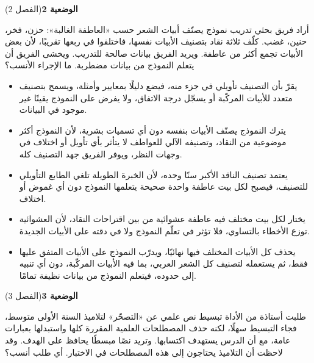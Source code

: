 \documentclass[11pt,a4paper]{article}
\begin{document}
\par\vspace{6pt}
\noindent
{\large\khatt\textbf{الوضعية 2}}\hfill{\small(الفصل 2)}\par\nopagebreak\vspace{3pt}
\setlength{\fboxsep}{7pt}\colorbox{gray!10}{\parbox{\dimexpr\linewidth-14pt}{أراد فريق بحثي تدريب نموذج يصنّف أبيات الشعر حسب «العاطفة الغالبة»: حزن، فخر، حنين، غضب. كلّف ثلاثة نقاد بتصنيف الأبيات نفسها، فاختلفوا في ربعها تقريبًا، لأن بعض الأبيات تجمع أكثر من عاطفة. ويريد الفريق بيانات صالحة للتدريب. ويخشى الفريق أن يتعلم النموذج من بيانات مضطربة. ما الإجراء الأنسب؟}}\par\nopagebreak
\begin{itemize}[leftmargin=1.0cm, labelsep=6pt, itemsep=3pt, topsep=4pt, parsep=0pt]
  \item[\textbf{أ)}] يقرّ بأن التصنيف تأويلي في جزء منه، فيضع دليلًا بمعايير وأمثلة، ويسمح بتصنيف متعدد للأبيات المركّبة أو يسجّل درجة الاتفاق، ولا يفرض على النموذج يقينًا غير موجود في البيانات.
  \item[\textbf{ب)}] يترك النموذج يصنّف الأبيات بنفسه دون أي تسميات بشرية، لأن النموذج أكثر موضوعية من النقاد، وتصنيفه الآلي للعواطف لا يتأثر بأي تأويل أو اختلاف في وجهات النظر، ويوفر الفريق جهد التصنيف كله.
  \item[\textbf{ج)}] يعتمد تصنيف الناقد الأكبر سنًا وحده، لأن الخبرة الطويلة تلغي الطابع التأويلي للتصنيف، فيصبح لكل بيت عاطفة واحدة صحيحة يتعلمها النموذج دون أي غموض أو اختلاف.
  \item[\textbf{د)}] يختار لكل بيت مختلف فيه عاطفة عشوائية من بين اقتراحات النقاد، لأن العشوائية توزع الأخطاء بالتساوي، فلا تؤثر في تعلّم النموذج ولا في دقته على الأبيات الجديدة.
  \item[\textbf{هـ)}] يحذف كل الأبيات المختلف فيها نهائيًا، ويدرّب النموذج على الأبيات المتفق عليها فقط، ثم يستعمله لتصنيف كل الشعر العربي، بما فيه الأبيات المركّبة، دون أي تنبيه إلى حدوده، فيتعلم النموذج من بيانات نظيفة تمامًا.
\end{itemize}
\par\vspace{6pt}
\noindent
{\large\khatt\textbf{الوضعية 3}}\hfill{\small(الفصل 3)}\par\nopagebreak\vspace{3pt}
\setlength{\fboxsep}{7pt}\colorbox{gray!10}{\parbox{\dimexpr\linewidth-14pt}{طلبت أستاذة من الأداة تبسيط نص علمي عن «التصحّر» لتلاميذ السنة الأولى متوسط، فجاء التبسيط سهلًا، لكنه حذف المصطلحات العلمية المقررة كلها واستبدلها بعبارات عامة، مع أن الدرس يستهدف اكتسابها. وتريد نصًا مبسطًا يحافظ على الهدف. وقد لاحظت أن التلاميذ يحتاجون إلى هذه المصطلحات في الاختبار. أي طلب أنسب؟}}\par\nopagebreak
\end{document}
